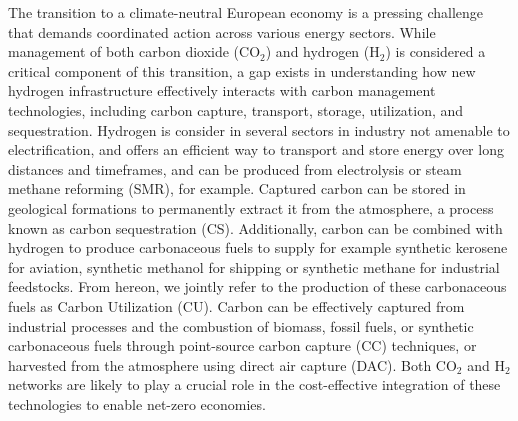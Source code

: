 \documentclass[twocolumn]{article}
\newcommand{\COtwo}{CO$_2$}
\newcommand{\Htwo}{H$_2$}
\begin{document}
The transition to a climate-neutral European economy is a pressing challenge that demands coordinated action across various energy sectors. While management of both carbon dioxide (\COtwo{}) and hydrogen (\Htwo{}) is considered a critical component of this transition, a gap exists in understanding how new hydrogen infrastructure effectively interacts with carbon management technologies, including carbon capture, transport, storage, utilization, and sequestration. Hydrogen is consider in several sectors in industry not amenable to electrification, and offers an efficient way to transport and store energy over long distances and timeframes, and can be produced from electrolysis or steam methane reforming (SMR), for example. Captured carbon can be stored in geological formations to permanently extract it from the atmosphere, a process known as carbon sequestration (CS). Additionally, carbon can be combined with hydrogen to produce carbonaceous fuels to supply for example synthetic kerosene for aviation, synthetic methanol for shipping or synthetic methane for industrial feedstocks. From hereon, we jointly refer to the production of these carbonaceous fuels as Carbon Utilization (CU). Carbon can be effectively captured from industrial processes and the combustion of biomass, fossil fuels, or synthetic carbonaceous fuels through point-source carbon capture (CC) techniques, or harvested from the atmosphere using direct air capture (DAC). Both \COtwo{} and \Htwo{} networks are likely to play a crucial role in the cost-effective integration of these technologies to enable net-zero economies.
\end{document}
